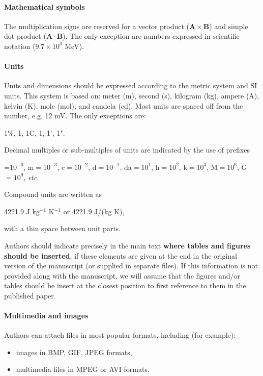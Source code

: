 \paragraph{Mathematical symbols}
    The multiplication signs are reserved for a vector product ($\mathbf{A}\times\mathbf{B}$) and simple dot product ($\mathbf{A}\cdot\mathbf{B}$). The only exception are numbers expressed in scientific notation ($9.7\times 10^3$ MeV).


\paragraph{Units}
    Units and dimensions should be expressed according to the metric system and SI units. This system is based on: meter (m), second (s), kilogram (kg), ampere (A), kelvin (K), mole (mol), and candela (cd). Most units are spaced off from the number, e.g. 12 mV. The only exceptions are:
\begin{center}
    1\%, 1\textperthousand, 1\textdegree C, 1\textdegree, 1', 1".
\end{center}

    Decimal multiples or sub-multiples of units are indicated by the use of prefixes

\begin{center}
    \textmu=$10^{-6}$, m$=10^{-3}$, c$=10^{-2}$, d$=10^{-1}$,
    da$=10^1$, h$=10^2$, k$=10^3$, M$=10^6$, G$=10^9$, {\em etc}.
\end{center}

    Compound units are written as
\begin{center}
    4221.9 J kg$^{-1}$ K$^{-1}$ or 4221.9 J/(kg K),
\end{center}
    with a thin space between unit parts.


    Authors should indicate precisely in the main text {\bf where tables and figures should be inserted}, if these elements are given at the end in the original version of the manuscript (or supplied in separate files).
    If this information is not provided along with the manuscript, we will assume that the figures and/or tables should be insert at the closest position to first reference to them in the published paper.

\paragraph{Multimedia and images}
    Authors can attach files in most popular formats, including (for example):
\begin{itemize}
\item images in BMP, GIF, JPEG formats,
\item multimedia files in MPEG or AVI formats.
\end{itemize}

